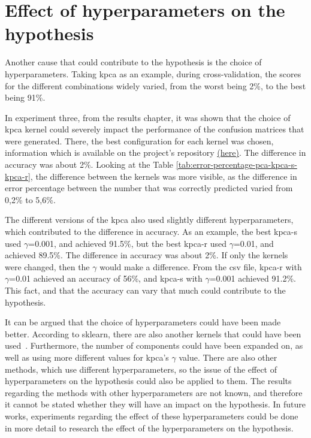 
\section{Effect of hyperparameters on the hypothesis}
Another cause that could contribute to the hypothesis is the choice of hyperparameters. Taking \gls{kpca} as an example, during cross-validation, the scores for the different combinations widely varied, from the worst being 2\%, to the best being 91\%.


In experiment three, from the results chapter, it was shown that the choice of \gls{kpca} kernel could severely impact the performance of the confusion matrices that were generated. There, the best configuration for each kernel was chosen, information which is available on the project's repository \href{https://github.com/AAU-Dat/P5-Nonlinear-Dimensionality-Reduction/blob/main/src/results/experiment_one/cross_validation_kernel_pca_svm_15000%20(1).csv}{(here)}. The difference in accuracy was about 2\%. Looking at the Table \ref{tab:error-percentage-pca-kpca-s-kpca-r}, the difference between the kernels was more visible, as the difference in error percentage between the number that was correctly predicted varied from 0,2\% to 5,6\%. 


The different versions of the \gls{kpca} also used slightly different hyperparameters, which contributed to the difference in accuracy. As an example, the best \gls{kpca-s} used $\gamma$=0.001, and achieved 91.5\%, but the best \gls{kpca-r} used $\gamma$=0.01, and achieved 89.5\%. The difference in accuracy was about 2\%. If only the kernels were changed, then the $\gamma$ would make a difference. From the csv file, \gls{kpca-r} with $\gamma$=0.01 achieved an accuracy of 56\%, and \gls{kpca-s} with $\gamma$=0.001 achieved 91.2\%. This fact, and that the accuracy can vary that much could contribute to the hypothesis.


It can be argued that the choice of hyperparameters could have been made better. According to \gls{sklearn}, there are also another kernels that could have been used~\cite{scikit-learn}. Furthermore, the number of components could have been expanded on, as well as using more different values for \gls{kpca}'s $\gamma$ value. There are also other methods, which use different hyperparameters, so the issue of the effect of hyperparameters on the hypothesis could also be applied to them. The results regarding the methods with other hyperparameters are not known, and therefore it cannot be stated whether they will have an impact on the hypothesis. In future works, experiments regarding the effect of these hyperparameters could be done in more detail to research the effect of the hyperparameters on the hypothesis.
